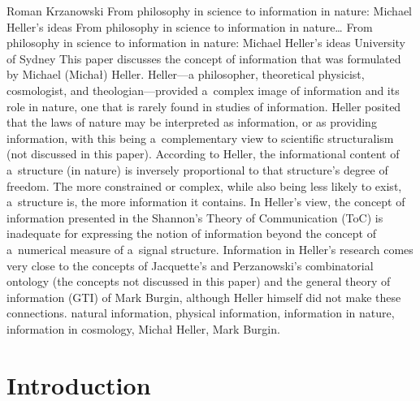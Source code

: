 \begin{artengenv}{Roman Krzanowski}
	{From philosophy in science to information in nature: Michael Heller's ideas}
	{From philosophy in science to information in nature\ldots}
	{From philosophy in science to information in nature: Michael Heller's ideas}
	{University of Sydney}
	{This paper discusses the concept of information that was formulated by Michael (Michał) Heller. Heller---a philosopher, theoretical physicist, cosmologist, and theologian---provided a~complex image of information and its role in nature, one that is rarely found in studies of information. Heller posited that the laws of nature may be interpreted as information, or as providing information, with this being a~complementary view to scientific structuralism (not discussed in this paper). According to Heller, the informational content of a~structure (in nature) is inversely proportional to that structure's degree of freedom. The more constrained or complex, while also being less likely to exist, a~structure is, the more information it contains. In Heller's view, the concept of information presented in the Shannon's Theory of Communication (ToC) is inadequate for expressing the notion of information beyond the concept of a~numerical measure of a~signal structure. Information in Heller's research comes very close to the concepts of Jacquette's and Perzanowski's combinatorial ontology (the concepts not discussed in this paper) and the general theory of information (GTI) of Mark Burgin, although Heller himself did not make these connections.
	}
	{natural information, physical information, information in nature, information in cosmology, Michał Heller, Mark Burgin.}



\section{Introduction}


\end{artengenv}
